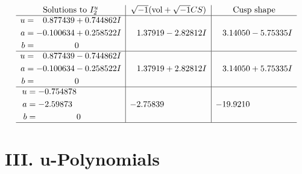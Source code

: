 \documentclass[1p]{elsarticle_modified}
\theoremstyle{definition}
\newcommand{\I}{\sqrt{-1}}
\begin{document}
$$\begin{array}{c|c|c}  
\text{Solutions to }I^u_{2}& \I (\text{vol} + \sqrt{-1}CS) & \text{Cusp shape}\\
 \hline 
\begin{aligned}
u &= \phantom{-}0.877439 + 0.744862 I \\
a &= -0.100634 + 0.258522 I \\
b &= \phantom{-0.000000 } 0\end{aligned}
 & \phantom{-}1.37919 - 2.82812 I & \phantom{-}3.14050 - 5.75335 I \\ \hline\begin{aligned}
u &= \phantom{-}0.877439 - 0.744862 I \\
a &= -0.100634 - 0.258522 I \\
b &= \phantom{-0.000000 } 0\end{aligned}
 & \phantom{-}1.37919 + 2.82812 I & \phantom{-}3.14050 + 5.75335 I \\ \hline\begin{aligned}
u &= -0.754878\phantom{ +0.000000I} \\
a &= -2.59873\phantom{ +0.000000I} \\
b &= \phantom{-0.000000 } 0\end{aligned}
 & -2.75839\phantom{ +0.000000I} & -19.9210\phantom{ +0.000000I}\\
 \hline 
 \end{array}$$\newpage
\newpage\renewcommand{\arraystretch}{1}
\centering \section*{ III. u-Polynomials}
\end{document}
